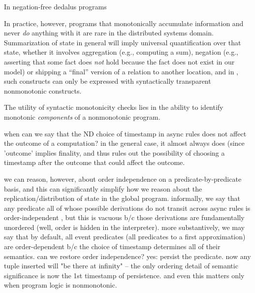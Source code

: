 \begin{lemma}
In negation-free dedalus programs
\end{lemma}


In practice, however, programs that monotonically accumulate information and never \emph{do} 
anything with it are rare in the distributed systems domain.  Summarization of state in 
general will imply universal quantification over that state, whether it involves aggregation (e.g., computing a sum), negation (e.g., asserting that some fact does \emph{not} hold because 
the fact does not exist in our model) or shipping a ``final'' version of a relation to another 
location, and in \lang, such constructs can only be expressed with syntactically transparent
nonmonotonic constructs.  

The utility of syntactic monotonicity checks lies in the ability to identify monotonic 
\emph{components} of a nonmonotonic program.



when can we say that the ND choice of timestamp in async rules does not affect the outcome
of a computation?  in the general case, it almost always does (since 'outcome' implies finality,
and thus rules out the possibility of choosing a timestamp after the outcome that could affect the outcome.

we can reason, however, about order independence on a predicate-by-predicate basis, and this
can significantly simplify how we reason about the replication/distribution of state in the
global program.  informally, we say that any predicate all of whose possible derivations 
do not transit across async rules is order-independent , but this is vacuous b/c those derivations
are fundamentally unordered (well, order is hidden in the interpreter).  more substantively,
we may say that by default, all event predicates (all predicates to a first approximation) 
are order-dependent b/c the choice of timestamp determines all of their semantics.  
can we restore order independence?  yes: persist the predicate.  now any tuple inserted will
"be there at infinity" -- the only ordering detail of semantic significance is now the 1st 
timestamp of persistence.  and even this matters only when program logic is nonmonotonic. 

